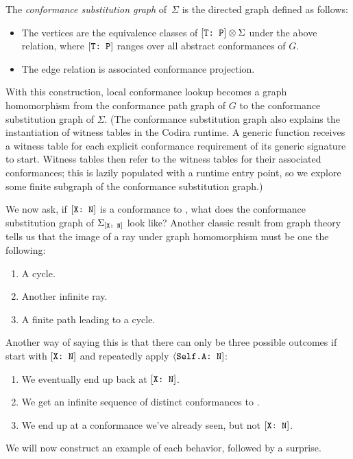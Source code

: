 \documentclass[../generics]{subfiles}
\begin{document}
\begin{definition}
The \emph{conformance substitution graph} of~$\Sigma$ is the directed graph defined as follows:
\begin{itemize}
\item The vertices are the equivalence classes of $[\texttt{T:~P}]\otimes\Sigma$ under the above relation, where $[\texttt{T:~P}]$ ranges over all abstract conformances of $G$.
\item The edge relation is associated conformance projection.
\end{itemize}

With this construction, local conformance lookup becomes a graph homomorphism from the conformance path graph of $G$ to the conformance substitution graph of $\Sigma$. (The conformance substitution graph also explains the instantiation of witness tables in the Codira runtime. A generic function receives a witness table for each explicit conformance requirement of its generic signature to start. Witness tables then refer to the witness tables for their associated conformances; this is lazily populated with a runtime entry point, so we explore some finite subgraph of the conformance substitution graph.)
\end{definition}

We now ask, if $[\texttt{X:~N}]$ is a conformance to \tN, what does the conformance substitution graph of $\Sigma_{[\texttt{X:~N}]}$ look like? Another classic result from graph theory tells us that the image of a ray under graph homomorphism must be one the following:
\begin{enumerate}
\item A cycle.
\item Another infinite ray.
\item A finite path leading to a cycle.
\end{enumerate}
Another way of saying this is that there can only be three possible outcomes if start with $[\texttt{X:~N}]$ and repeatedly apply $\langle\texttt{Self.A:~N}]$:
\begin{enumerate}
\item We eventually end up back at $[\texttt{X:~N}]$.
\item We get an infinite sequence of distinct conformances to \tN.
\item We end up at a conformance we've already seen, but not $[\texttt{X:~N}]$.
\end{enumerate}
We will now construct an example of each behavior, followed by a surprise.
\end{document}
